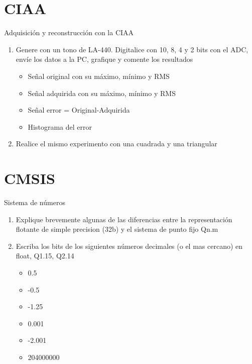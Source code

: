  \section{CIAA}
 \begin{frame}{Adquisición y reconstrucción con la CIAA}
    \begin{enumerate}
       \item{Genere con un tono de LA-440. Digitalice con 10, 8, 4 y 2 bits con el ADC, envíe los datos a la PC, grafique y comente los resultados}
          \begin{itemize}
             \item{Señal original con su máximo, mínimo y RMS }
             \item{Señal adquirida con su máximo, mínimo y RMS }
             \item{Señal error = Original-Adquirida}
             \item{Histograma del error}
          \end{itemize}
       \item{Realice el mismo experimento con una cuadrada y una triangular}
    \end{enumerate}
 \end{frame}
 \section{CMSIS}
 \begin{frame}{Sistema de números}
    \begin{enumerate}
       \item{Explique brevemente algunas de las diferencias entre la representación flotante de simple precision (32b) y el sistema de punto fijo Qn.m}
       \item{Escriba los bits de los siguientes números decimales (o el mas cercano) en float, Q1.15, Q2.14 }
          \begin{itemize}
             \item{0.5}
             \item{-0.5}
             \item{-1.25}
             \item{0.001}
             \item{-2.001}
             \item{204000000}
          \end{itemize}
    \end{enumerate}
 \end{frame}
